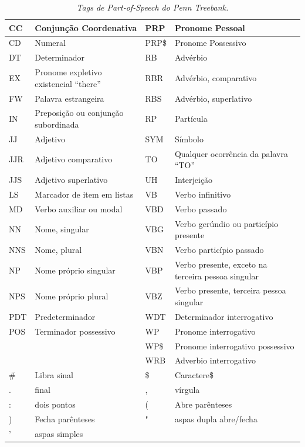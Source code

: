 \begin{table}
   \centering
   \small
   \caption{\it Tags de \emph{Part-of-Speech} do \emph{Penn Treebank}.}

   \begin{tabular}{| p{2cm} | p{4cm} | p{2cm} | p{4cm} |}

   \hline

		CC & Conjunção Coordenativa 	& 	PRP & Pronome Pessoal\\
    \hline
		CD & Numeral &   	PRP\$ & Pronome Possessivo\\
      \hline
		DT & Determinador     &		RB & Advérbio\\
      \hline
		EX & Pronome expletivo existencial ``there''     &		RBR & Advérbio, comparativo\\
      \hline
		FW & Palavra estrangeira     &		RBS & Advérbio, superlativo\\
      \hline
		IN & Preposição ou conjunção subordinada      &		RP & Partícula\\
      \hline
		JJ & Adjetivo      &		SYM & Símbolo\\
      \hline
		JJR & Adjetivo comparativo      &		TO & Qualquer ocorrência da palavra ``TO''\\
      \hline
		JJS & Adjetivo superlativo      &		UH & Interjeição\\
      \hline
		LS & Marcador de item em listas      &		VB & Verbo infinitivo\\
      \hline
		MD & Verbo auxiliar ou modal      &		VBD & Verbo passado\\
      \hline
		NN & Nome, singular      &		VBG & Verbo gerúndio ou particípio presente\\
      \hline
		NNS & Nome, plural      &		VBN & Verbo particípio passado\\
      \hline
		NP & Nome próprio singular      &		VBP & Verbo presente, exceto na terceira pessoa singular\\
      \hline
		NPS & Nome próprio plural      &		VBZ & Verbo presente, terceira pessoa singular\\
      \hline
		PDT & Predeterminador      &		WDT & Determinador interrogativo\\
      \hline
		POS & Terminador possessivo      &		WP & Pronome interrogativo\\
    \hline
     & & 	WP\$ & Pronome interrogativo possessivo\\
    \hline
     & & 	WRB & Adverbio interrogativo  \\
    \hline
     \# & Libra sinal & \$ & Caractere\$ \\
    \hline
     . & final & , & vírgula \\
    \hline
     : & dois pontos & ( & Abre parênteses \\
    \hline
     ) & Fecha parênteses & " & aspas dupla abre/fecha \\
     \hline
     ' & aspas simples & &  \\
    \hline

   \end{tabular}
   \label{tbl:penn_treebank_pos}
\end{table}


